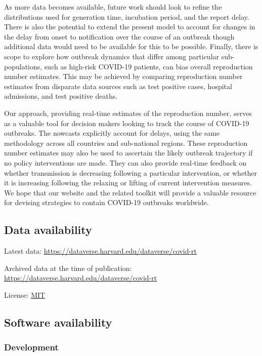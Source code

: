 \documentclass[
]{article}
\begin{document}
As more data becomes available, future work should look to refine the
distributions used for generation time, incubation period, and the
report delay. There is also the potential to extend the present model to
account for changes in the delay from onset to notification over the
course of an outbreak though additional data would need to be available
for this to be possible. Finally, there is scope to explore how outbreak
dynamics that differ among particular sub-populations, such as high-risk
COVID-19 patients, can bias overall reproduction number estimates. This
may be achieved by comparing reproduction number estimates from
disparate data sources such as test positive cases, hospital admissions,
and test positive deaths.

Our approach, providing real-time estimates of the reproduction number,
serves as a valuable tool for decision makers looking to track the
course of COVID-19 outbreaks. The nowcasts explicitly account for
delays, using the same methodology across all countries and sub-national
regions. These reproduction number estimates may also be used to
ascertain the likely outbreak trajectory if no policy interventions are
made. They can also provide real-time feedback on whether transmission
is decreasing following a particular intervention, or whether it is
increasing following the relaxing or lifting of current intervention
measures. We hope that our website and the related toolkit will provide
a valuable resource for devising strategies to contain COVID-19
outbreaks worldwide.

\hypertarget{data-availability}{%
\subsection{Data availability}\label{data-availability}}

Latest data: \url{https://dataverse.harvard.edu/dataverse/covid-rt}

Archived data at the time of publication:
\url{https://dataverse.harvard.edu/dataverse/covid-rt}

License: \href{https://opensource.org/licenses/MIT}{MIT}

\hypertarget{software-availability}{%
\subsection{Software availability}\label{software-availability}}

\hypertarget{development}{%
\subsubsection{Development}\label{development}}
\end{document}
